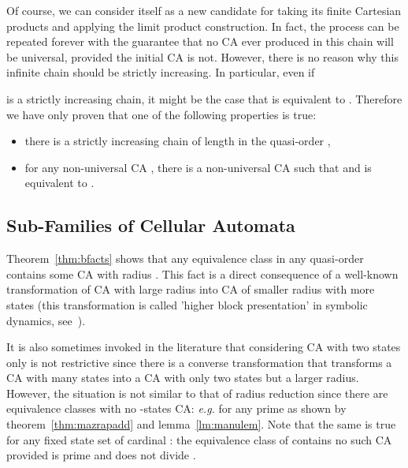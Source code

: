 \documentclass[a4paper]{elsarticle}
\def\qed{\relax\ifmmode\hskip2em \blacksquare\else\unskip\nobreak\hfill\hskip1em \fi}
\begin{document}

Of course, we can consider  itself as a new candidate
for taking its finite Cartesian products and applying the limit
product construction. In fact, the process can be repeated forever
with the guarantee that no CA ever produced in this chain will be
universal, provided the initial CA is not. However, there is no reason
why this infinite chain should be strictly increasing. In particular,
even if

is a strictly increasing chain, it might be the case that
 is equivalent to
. Therefore we have only proven
that one of the following properties is true:
\begin{itemize}
\item there is a strictly increasing chain of length
   in the quasi-order ,
\item for any non-universal CA , there is a non-universal CA
   such that  and  is
  equivalent to .
\end{itemize}

\subsection{Sub-Families of Cellular Automata}
\label{sec:fam}

Theorem~\ref{thm:bfacts} shows that any equivalence class in any
quasi-order contains some CA with radius . This fact is a direct
consequence of a well-known transformation of CA with large radius
into CA of smaller radius with more states (this transformation is
called 'higher block presentation' in symbolic dynamics,
see~\cite{LindMarcus}).

It is also sometimes invoked in the literature that considering CA
with two states only is not restrictive since there is a converse
transformation that transforms a CA with many states into a CA with
only two states but a larger radius. However, the situation is not
similar to that of radius reduction since there are equivalence
classes with no -states CA: \textit{e.g.}   for any prime
 as shown by theorem~\ref{thm:mazrapadd} and
lemma~\ref{lm:manulem}. Note that the same is true for any fixed state
set of cardinal : the equivalence class of  contains no
such CA provided  is prime and does not divide .
\end{document}
